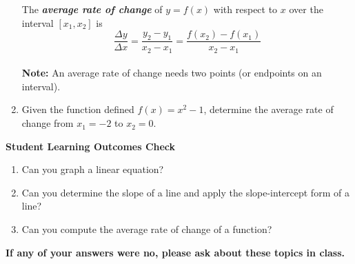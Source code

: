 \begin{enumerate}
 The \textbf{\emph{average rate of change}} of $y=f(x)$ with respect to $x$ over the interval $[x_1,x_2]$ is
 $$\frac{\Delta y}{\Delta x}=\frac{y_2-y_1}{x_2-x_1}=\frac{f(x_2)-f(x_1)}{x_2-x_1}$$\\ 
 
\noindent \textbf{Note:  }An average rate of change needs two points (or endpoints on an interval). 


\clearpage

\item Given the function defined $f(x)=x^2-1$, determine the average rate of change from $x_1=-2$ to $x_2=0.$\\[2in]


\end{enumerate}

\vfill

\noindent \textbf{Student Learning Outcomes Check}

\begin{enumerate}
\item Can you graph a linear equation?
\item Can you determine the slope of a line and apply the slope-intercept form of a line?
\item Can you compute the average rate of change of a function?
\end{enumerate}

\noindent \textbf{If any of your answers were no, please ask about these topics in class.}

